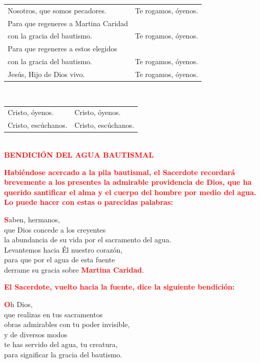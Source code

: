 \documentclass[12pt, letterpaper]{report}
\begin{document}
\begin{tabular}{ll}
Nosotros, que somos pecadores.& Te rogamos, \'oyenos. \\
Para que regeneres a Martina Caridad \\
con la gracia del bautismo.& Te rogamos, \'oyenos. \\
Para que regeneres a estos elegidos \\
con la gracia del bautismo.& Te rogamos, \'oyenos. \\
Jes\'us, Hijo de Dios vivo.& Te rogamos, \'oyenos.
\end{tabular} \newline \\

\begin{tabular}{ll}
Cristo, \'oyenos.& Cristo, \'oyenos. \\
Cristo, esc\'uchanos.& Cristo, esc\'uchanos. \\
\end{tabular} \newline \\

\Large {\bfseries \textcolor{red}{BENDICI\'ON DEL AGUA BAUTISMAL}} \newline

\large {\bfseries \textcolor{red}{Habi\'endose acercado a la pila bautismal, el Sacerdote recordar\'a brevemente a los presentes la admirable providencia de Dios, que ha querido santificar el alma y el cuerpo del hombre por medio del agua. Lo puede hacer con estas o parecidas palabras:}} \newline

\lettrine[lines=1]{\bfseries \textcolor{red}{S}}{}\Large aben, hermanos, \\
que Dios concede a los creyentes \\
la abundancia de su vida por el sacramento del agua. \\
Levantemos hacia \'El nuestro coraz\'on, \\
para que por el agua de esta fuente \\
derrame su gracia sobre {\bfseries \textcolor{red}{Martina Caridad}}. \newline

\large {\bfseries \textcolor{red}{El Sacerdote, vuelto hacia la fuente, dice la siguiente bendici\'on:}} \newline

\lettrine[lines=1]{\bfseries \textcolor{red}{O}}{}\Large h Dios, \\
que realizas en tus sacramentos \\
obras admirables con tu poder invisible, \\
y de diversos modos \\
te has servido del agua, tu creatura, \\
para significar la gracia del bautismo. \newline
\end{document}
